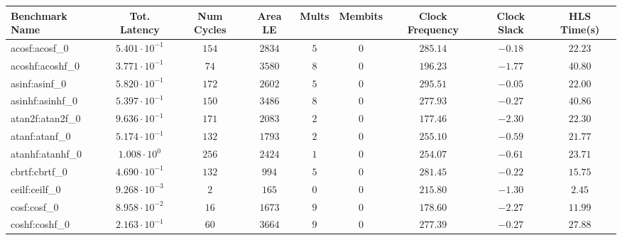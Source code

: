 \begin{tabular}{|l|c|c|c|c|c|c|c|c|}
\hline
Benchmark Name               & Tot. Latency            & Num Cycles & Area LE   & Mults   & Membits & Clock Frequency & Clock Slack & HLS Time(s) \\
\hline
acosf:acosf\_0               & $ 5.401 \cdot 10^{-1} $ & $ 154    $ & $ 2834  $ & $ 5   $ & $ 0   $ & $ 285.14      $ & $ -0.18   $ & $ 22.23   $ \\
acoshf:acoshf\_0             & $ 3.771 \cdot 10^{-1} $ & $ 74     $ & $ 3580  $ & $ 8   $ & $ 0   $ & $ 196.23      $ & $ -1.77   $ & $ 40.80   $ \\
asinf:asinf\_0               & $ 5.820 \cdot 10^{-1} $ & $ 172    $ & $ 2602  $ & $ 5   $ & $ 0   $ & $ 295.51      $ & $ -0.05   $ & $ 22.00   $ \\
asinhf:asinhf\_0             & $ 5.397 \cdot 10^{-1} $ & $ 150    $ & $ 3486  $ & $ 8   $ & $ 0   $ & $ 277.93      $ & $ -0.27   $ & $ 40.86   $ \\
atan2f:atan2f\_0             & $ 9.636 \cdot 10^{-1} $ & $ 171    $ & $ 2083  $ & $ 2   $ & $ 0   $ & $ 177.46      $ & $ -2.30   $ & $ 22.30   $ \\
atanf:atanf\_0               & $ 5.174 \cdot 10^{-1} $ & $ 132    $ & $ 1793  $ & $ 2   $ & $ 0   $ & $ 255.10      $ & $ -0.59   $ & $ 21.77   $ \\
atanhf:atanhf\_0             & $ 1.008 \cdot 10^{0}  $ & $ 256    $ & $ 2424  $ & $ 1   $ & $ 0   $ & $ 254.07      $ & $ -0.61   $ & $ 23.71   $ \\
cbrtf:cbrtf\_0               & $ 4.690 \cdot 10^{-1} $ & $ 132    $ & $ 994   $ & $ 5   $ & $ 0   $ & $ 281.45      $ & $ -0.22   $ & $ 15.75   $ \\
ceilf:ceilf\_0               & $ 9.268 \cdot 10^{-3} $ & $ 2      $ & $ 165   $ & $ 0   $ & $ 0   $ & $ 215.80      $ & $ -1.30   $ & $ 2.45    $ \\
cosf:cosf\_0                 & $ 8.958 \cdot 10^{-2} $ & $ 16     $ & $ 1673  $ & $ 9   $ & $ 0   $ & $ 178.60      $ & $ -2.27   $ & $ 11.99   $ \\
coshf:coshf\_0               & $ 2.163 \cdot 10^{-1} $ & $ 60     $ & $ 3664  $ & $ 9   $ & $ 0   $ & $ 277.39      $ & $ -0.27   $ & $ 27.88   $ \\

\end{tabular}
